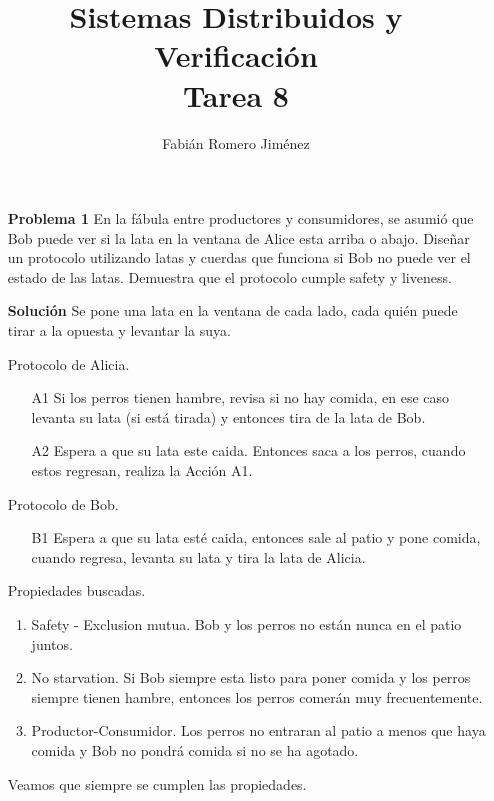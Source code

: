 \documentclass{article}
\title{Sistemas Distribuidos y Verificación \\ Tarea 8}
\author{Fabián Romero Jiménez}
\date{}
\begin{document}
\maketitle

\begin{enumerate}

\item[\bf{Problema 1}] En la fábula entre productores y consumidores, se asumió que Bob puede ver si la lata en la ventana de Alice esta arriba o abajo. Diseñar un protocolo utilizando latas y cuerdas que funciona si Bob no puede ver el estado de las latas. Demuestra que el protocolo cumple safety y liveness.

\item[\bf{Solución}]
Se pone una lata en la ventana de cada lado, cada quién puede tirar a la opuesta y levantar la suya.

Protocolo de Alicia.\\
\begin{enumerate}
\item[A1] Si los perros tienen hambre, revisa si no hay comida, en ese caso levanta su lata (si está tirada) y entonces tira de la lata de Bob.

\item[A2] Espera a que su lata este caida. Entonces saca a los perros, cuando estos regresan, realiza la Acción A1.
\end{enumerate}

Protocolo de Bob.\\
\begin{enumerate}
\item[B1] Espera a que su lata esté caida, entonces sale al patio y pone comida, cuando regresa,  levanta su lata y tira la lata de Alicia.
\end{enumerate}

Propiedades buscadas.
\begin{enumerate}
\item{Safety - Exclusion mutua}. Bob y los perros no están nunca en el patio juntos.
\item{No starvation}. Si Bob siempre esta listo para poner comida y los perros siempre tienen hambre, entonces los perros comerán muy frecuentemente.
\item{Productor-Consumidor}. Los perros no entraran al patio a menos que haya comida y Bob no pondrá comida si no se ha agotado.
\end{enumerate}

Veamos que siempre se cumplen las propiedades.\\


\end{enumerate}
\end{document}
